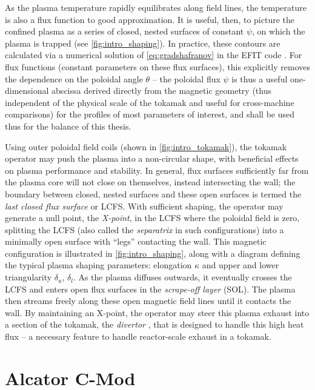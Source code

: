 \noindent As the plasma temperature rapidly equilibrates along field lines, the temperature is also a flux function to good approximation.  It is useful, then, to picture the confined plasma as a series of closed, nested surfaces of constant $\psi$, on which the plasma is trapped (see \cref{fig:intro_shaping}).  In practice, these contours are calculated via a numerical solution of \cref{eq:gradshafranov} in the EFIT code \cite{Lao1985}.  For flux functions (\ie constant parameters on these flux surfaces), this explicitly removes the dependence on the poloidal angle $\theta$ -- the poloidal flux $\psi$ is thus a useful one-dimensional abscissa derived directly from the magnetic geometry (thus independent of the physical scale of the tokamak and useful for cross-machine comparisons) for the profiles of most parameters of interest, and shall be used thus for the balance of this thesis.

Using outer poloidal field coils (shown in \cref{fig:intro_tokamak}), the tokamak operator may push the plasma into a non-circular shape, with beneficial effects on plasma performance and stability.  In general, flux surfaces sufficiently far from the plasma core will not close on themselves, instead intersecting the wall; the boundary between closed, nested surfaces and these open surfaces is termed the \emph{last closed flux surface} or LCFS.  With sufficient shaping, the operator may generate a null point, the \emph{X-point}, in the LCFS where the poloidal field is zero, splitting the LCFS (also called the \emph{separatrix} in such configurations) into a minimally open surface with ``legs'' contacting the wall.  This magnetic configuration is illustrated in \cref{fig:intro_shaping}, along with a diagram defining the typical plasma shaping parameters: elongation $\kappa$ and upper and lower triangularity $\delta_u$, $\delta_l$.  As the plasma diffuses outwards, it eventually crosses the LCFS and enters 
open flux surfaces in the \emph{scrape-off layer} (SOL).  The plasma then streams freely along these open magnetic field lines until it contacts the wall.  By maintaining an X-point, the operator may steer this plasma exhaust into a section of the tokamak, the \emph{divertor} \cite{Wesson2011}, that is designed to handle this high heat flux -- a necessary feature to handle reactor-scale exhaust in a tokamak.\nicesectionending


\section{Alcator C-Mod}\label{sec:intro_cmod}

